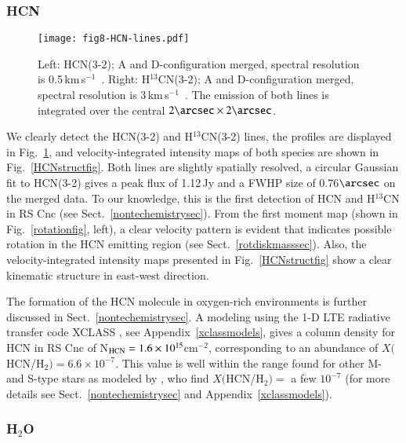 \documentclass{aa}
\newcommand{\kms}{\,km\,s$^{-1}$~}
\begin{document}
\subsubsection{HCN}\label{hcnsec}

\begin{figure}[h]
    \centering
    \vspace{-3.0cm}
    \texttt{[image: fig8-HCN-lines.pdf]}
    \caption{Left: HCN(3-2); A and D-configuration merged, spectral resolution 
             is 0.5\kms.
             Right: H$^{13}$CN(3-2); A and D-configuration merged, spectral 
             resolution is 3\kms.
             The emission of both lines is integrated over the
             central $2\arcsec \times 2\arcsec$.} 
    \label{hcndetecfig}
\end{figure}

We clearly detect the HCN(3-2) and H$^{13}$CN(3-2) lines, the profiles
are displayed in  Fig.~\ref{hcndetecfig}, and velocity-integrated
intensity maps of both species are shown in Fig.~\ref{HCNstructfig}.
Both lines are slightly spatially resolved, a circular Gaussian fit to
HCN(3-2) gives a peak flux of 1.12\,Jy and a FWHP size of
0.76$\arcsec$ on the merged data. To our knowledge, this is the first
detection of HCN and H$^{13}$CN  in RS Cnc (see
Sect.~\ref{nontechemistrysec}).  From the first moment map (shown in
Fig.~\ref{rotationfig}, left), a clear velocity pattern is evident
that indicates possible rotation in the HCN emitting region (see
Sect.~\ref{rotdiskmasssec}). Also, the velocity-integrated intensity
maps presented in Fig.~\ref{HCNstructfig} show a clear kinematic
structure in east-west direction.

The formation of the HCN molecule in oxygen-rich environments is
further discussed in Sect.~\ref{nontechemistrysec}. A modeling using
the 1-D LTE radiative transfer code XCLASS \citep{moeller2017}, see
Appendix~\ref{xclassmodels}, gives a column density for HCN in RS Cnc
of N$_{\rm HCN}=1.6\times10^{15}$cm$^{-2}$, corresponding to an
abundance of $X($HCN/H$_2) = 6.6\times10^{-7}$. This value is well
within the range found for other M- and S-type stars as modeled by
\citet{sroetal2013}, who find $X($HCN/H$_2) =$ a few $10^{-7}$ (for
more details see Sect.~\ref{nontechemistrysec} and
Appendix~\ref{xclassmodels}).

\subsubsection{H$_2$O}\label{watersec}
\end{document}
